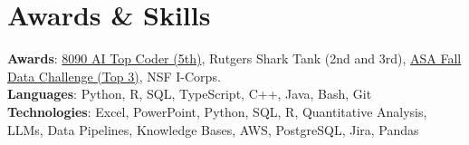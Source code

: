 \documentclass[letterpaper,11pt]{article}
\begin{document}
\section{Awards \& Skills}
 \begin{itemize}[leftmargin=0.15in, label={}]
    \small{\item{
     \textbf{Awards}{: \href{https://github.com/AkeBoss-tech/top-coder-challenge}{8090 AI Top Coder (5th)}, Rutgers Shark Tank (2nd and 3rd), \href{https://acashmoney.biz/portfolio/asa-fall-data/}{ASA Fall Data Challenge (Top 3)}, NSF I-Corps.} \\
     \textbf{Languages}{: Python, R, SQL, TypeScript, C++, Java, Bash, Git} \\
     \textbf{Technologies}{: Excel, PowerPoint, Python, SQL, R, Quantitative Analysis, LLMs, Data Pipelines, Knowledge Bases, AWS, PostgreSQL, Jira, Pandas}
    }}
 \end{itemize}
\end{document}
